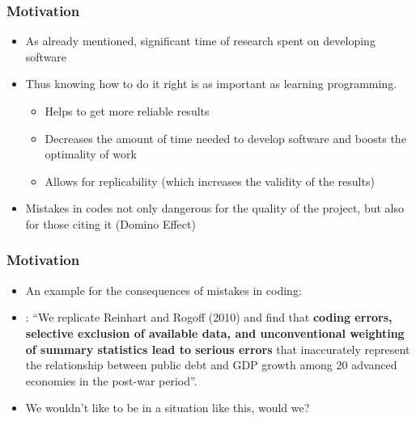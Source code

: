 \documentclass{beamer}
\newcommand{\highlight}[1]{{\color{blue}{#1}}}
\renewcommand{\highlight}[1]{{\textbf{#1}}}
\begin{document}
\begin{frame}
\frametitle{Motivation}
\begin{itemize}
\item As already mentioned, significant time of research spent on developing software
\item Thus knowing how to do it right is as important as learning programming.
\begin{itemize}
\item Helps to get more reliable results
\item Decreases the amount of time needed to develop software and boosts the optimality of work
\item Allows for replicability (which increases the validity of the results)
\end{itemize}
\item Mistakes in codes not only dangerous for the quality of the project, but also for those citing it (Domino Effect)
\end{itemize}
\end{frame}

\begin{frame}
\frametitle{Motivation}
\begin{itemize}
\item An example for the consequences of mistakes in coding: 
\item \citet{Herndonetal2014}: ``We replicate Reinhart and Rogoff (2010) and find that \highlight{coding errors, selective exclusion of available data, and unconventional weighting of summary statistics lead to serious errors} that inaccurately represent the relationship between public debt and GDP growth  among 20 advanced economies in the post-war period''.
\item We wouldn't like to be in a situation like this, would we?
\end{itemize}
\end{frame}
\end{document}
